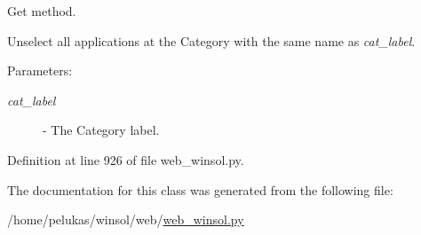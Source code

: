 Get method. 

Unselect all applications at the Category with the same name as {\em cat\_\-label\/}.

\begin{Desc}
\item[Parameters:]
\begin{description}
\item[{\em cat\_\-label}]- The Category label. \end{description}
\end{Desc}


Definition at line 926 of file web\_\-winsol.py.

The documentation for this class was generated from the following file:\begin{CompactItemize}
\item 
/home/pelukas/winsol/web/\hyperlink{web__winsol_8py}{web\_\-winsol.py}\end{CompactItemize}
